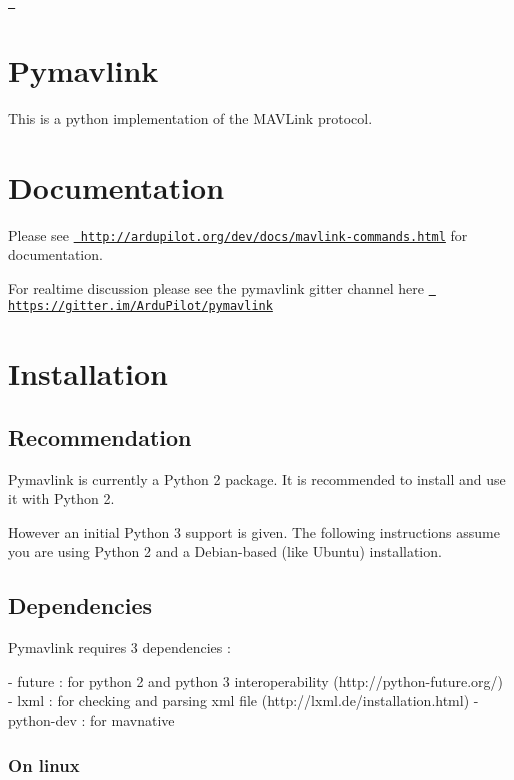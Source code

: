 \href{https://travis-ci.org/ArduPilot/pymavlink}{\texttt{ }} \section*{Pymavlink}

This is a python implementation of the M\+A\+V\+Link protocol.

\section*{Documentation}

Please see \href{http://ardupilot.org/dev/docs/mavlink-commands.html}{\texttt{ http\+://ardupilot.\+org/dev/docs/mavlink-\/commands.\+html}} for documentation.

For realtime discussion please see the pymavlink gitter channel here \href{https://gitter.im/ArduPilot/pymavlink}{\texttt{ https\+://gitter.\+im/\+Ardu\+Pilot/pymavlink}}

\section*{Installation}

\subsection*{Recommendation}

Pymavlink is currently a Python 2 package. It is recommended to install and use it with Python 2.

However an initial Python 3 support is given. The following instructions assume you are using Python 2 and a Debian-\/based (like Ubuntu) installation.

\subsection*{Dependencies}

Pymavlink requires 3 dependencies \+: \begin{DoxyVerb}- future : for python 2 and python 3 interoperability (http://python-future.org/)
- lxml : for checking and parsing xml file (http://lxml.de/installation.html)
- python-dev : for mavnative
\end{DoxyVerb}


\subsubsection*{On linux}


